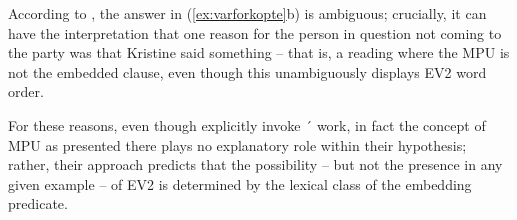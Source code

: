 \documentclass[output=paper]{langsci/langscibook}
\begin{document}

According to \citet[1929]{WiklundEtAl2009}, the answer in (\ref{ex:varforkopte}b) is ambiguous; crucially, it can have the interpretation that one reason for the {person} in {question} not coming to the party was that Kristine said something -- that is, a reading where the MPU is not the embedded clause, even though this unambiguously displays EV2 word order.

For these reasons, even though \citet{WiklundEtAl2009} explicitly invoke \citeauthor{Simons2007}´ work, in fact the concept of MPU as presented there plays no explanatory role within their hypothesis; rather, their approach predicts that the possibility -- but not the presence in any given example -- of EV2 is determined by the lexical class of the embedding predicate. 
\end{document}
